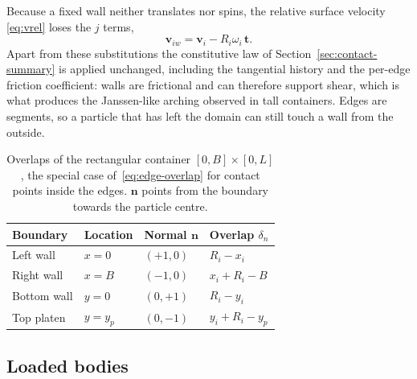 Because a fixed wall neither translates nor spins, the relative surface velocity
\eqref{eq:vrel} loses the $j$ terms,
\begin{equation}
  \mathbf{v}_{iw} = \mathbf{v}_{i} - R_{i}\omega_{i}\,\mathbf{t} .
  \label{eq:vrel-wall}
\end{equation}
Apart from these substitutions the constitutive law of
Section~\ref{sec:contact-summary} is applied unchanged, including the tangential
history and the per-edge friction coefficient: walls are frictional and can
therefore support shear, which is what produces the Janssen-like arching
observed in tall containers.  Edges are segments, so a particle that has left
the domain can still touch a wall from the outside.

\begin{table}[htbp]
  \centering
  \caption{Overlaps of the rectangular container $[0,B]\times[0,L]$, the special
  case of~\eqref{eq:edge-overlap} for contact points inside the edges.
  $\mathbf{n}$ points from the boundary towards the particle centre.}
  \label{tab:boundaries}
  \begin{tabular}{llll}
    \toprule
    Boundary & Location & Normal $\mathbf{n}$ & Overlap $\delta_{n}$ \\
    \midrule
    Left wall   & $x=0$    & $(+1,0)$ & $R_{i}-x_{i}$ \\
    Right wall  & $x=B$    & $(-1,0)$ & $x_{i}+R_{i}-B$ \\
    Bottom wall & $y=0$    & $(0,+1)$ & $R_{i}-y_{i}$ \\
    Top platen  & $y=y_{p}$& $(0,-1)$ & $y_{i}+R_{i}-y_{p}$ \\
    \bottomrule
  \end{tabular}
\end{table}

\subsection{Loaded bodies}
\label{sec:platen}


